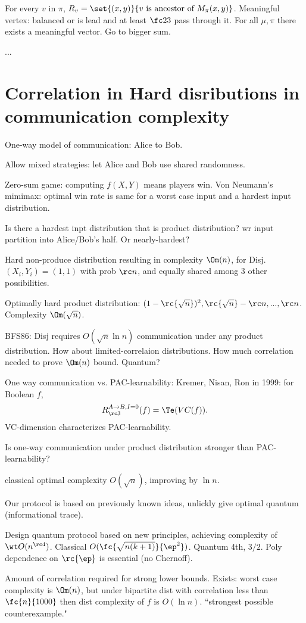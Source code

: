 For every $v$ in $\pi$, $R_v=\set{(x,y)}{v\text{ is ancestor of }M_\pi(x,y)}$. 
Meaningful vertex: balanced or is lead and at least $\fc23$ pass through it.
For all $\mu,\pi$ there exists a meaningful vector. Go to bigger sum.

...

\section{Correlation in Hard disributions in communication complexity}

One-way model of communication: Alice to Bob.

Allow mixed strategies: let Alice and Bob use shared randomness.

Zero-sum game: computing $f(X,Y)$ means players win.  Von Neumann's mimimax: optimal win rate is same for a worst case input and a hardest input distribution.

Is there a hardest inpt distribution that is product distribution? wr input partition into Alice/Bob's half. Or nearly-hardest?

Hard non-produce distribution resulting in complexity $\Om(n)$, for Disj. $(X_i,Y_i)= (1,1)$ with prob $\rc n$, and equally shared among 3 other possibilities.

Optimally hard product distribution: $(1-\rc{\sqrt n})^2, \rc{\sqrt n}-\rc n ,...,\rc n$. Complexity $\Om(\sqrt n)$.

BFS86: Disj requires $O(\sqrt n \ln n)$ communication under any product distribution. How about limited-correlaion distributions.
How much correlation needed to prove $\Om(n)$ bound. Quantum?

One way communication vs. PAC-learnability: Kremer, Nisan, Ron in 1999: for Boolean $f$,
\[
R_{\rc 3}^{A\to B, I=0}(f) = \Te(VC(f)).
\]
VC-dimension characterizes PAC-learnability.

Is one-way communication under product distribution stronger than PAC-learnability?

classical optimal complexity $O(\sqrt n)$, improving by $\ln n$.

Our protocol is based on previously known ideas, unlickly give optimal quantum (informational trace).

Design quantum protocol based on new principles, achieving complexity of $\wt O(n^{\rc 4})$. Classical $O(\fc{\sqrt{n(k+1)}}{\ep^2})$. Quantum 4th, $3/2$. Poly dependence on $\rc{\ep}$ is essential (no Chernoff).

Amount of correlation required for strong lower bounds. 
Exists: worst case complexity is $\Om(n)$, but under bipartite dist with correlation less than $\fc{n}{1000}$ then dist complexity of $f$ is $O(\ln n)$. ``strongest possible counterexample."

